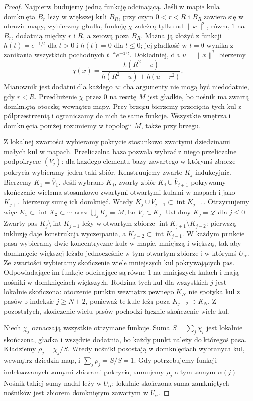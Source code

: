 \begin{proof}
Najpierw budujemy jedną funkcję odcinającą.
Jeśli w mapie kula domknięta $\overline B_r$
leży w większej kuli $B_R$, przy czym $0<r<R$
i $\overline B_R$ zawiera się w obrazie mapy,
wybierzmy gładką funkcję $\chi$ zależną tylko
od $\|x\|^2$, równą $1$ na $\overline B_r$,
dodatnią między $r$ i $R$, a zerową poza $B_R$.
Można ją złożyć z funkcji $h(t)=e^{-1/t}$ dla
$t>0$ i $h(t)=0$ dla $t\leq0$; jej gładkość w
$t=0$ wynika z zanikania wszystkich pochodnych
$t^{-a}e^{-1/t}$. Dokładniej, dla $u=\|x\|^2$ bierzemy
\[
 \chi(x)=\frac{h(R^2-u)}{h(R^2-u)+h(u-r^2)}.
\]
Mianownik jest dodatni dla każdego $u$: oba argumenty
nie mogą być niedodatnie, gdy $r<R$.
Przedłużenie $\chi$ przez $0$
na resztę $M$ jest gładkie, bo nośnik ma zwartą
domkniętą otoczkę wewnątrz mapy. Przy brzegu bierzemy
przecięcia tych kul z półprzestrzenią i ograniczamy do nich
te same funkcje. Wszystkie wnętrza i domknięcia poniżej
rozumiemy w topologii $M$, także przy brzegu.

Z lokalnej zwartości wybieramy pokrycie stosunkowo
zwartymi dziedzinami małych kul w mapach. Przeliczalna
baza pozwala wybrać z niego przeliczalne podpokrycie
$(V_j)$: dla każdego elementu bazy zawartego w którymś
zbiorze pokrycia wybieramy jeden taki zbiór.
Konstruujemy zwarte $K_j$ indukcyjnie.
Bierzemy $K_1=\overline V_1$. Jeśli wybrano $K_j$,
zwarty zbiór $K_j\cup\overline V_{j+1}$ pokrywamy
skończenie wieloma stosunkowo zwartymi otwartymi
kulami w mapach i jako $K_{j+1}$ bierzemy sumę
ich domknięć. Wtedy
$K_j\cup\overline V_{j+1}\subset\operatorname{int}K_{j+1}$.
Otrzymujemy więc
$K_1\subset\operatorname{int}K_2\subset\cdots$
oraz $\bigcup_jK_j=M$, bo $V_j\subset K_j$.
Ustalmy $K_j=\varnothing$ dla $j\leq0$.
Zwarty pas $K_j\setminus\operatorname{int}K_{j-1}$
leży w otwartym zbiorze
$\operatorname{int}K_{j+1}\setminus K_{j-2}$:
pierwszą inkluzję daje konstrukcja wyczerpania,
a $K_{j-2}\subset\operatorname{int}K_{j-1}$.
W każdym punkcie pasa wybieramy dwie koncentryczne
kule w mapie, mniejszą i większą, tak aby domknięcie
większej leżało jednocześnie w tym otwartym zbiorze
i w którymś $U_\alpha$. Ze zwartości wybieramy
skończenie wiele mniejszych kul pokrywających pas.
Odpowiadające im funkcje odcinające są równe $1$
na mniejszych kulach i mają nośniki w domknięciach większych.
Rodzina tych kul dla wszystkich $j$ jest
lokalnie skończona: otoczenie punktu wewnątrz
pewnego $K_N$ nie spotyka kul z pasów o indeksie
$j\geq N+2$, ponieważ te kule leżą poza
$K_{j-2}\supset K_N$. Z pozostałych, skończenie
wielu pasów pochodzi łącznie skończenie wiele kul.

Niech $\chi_j$ oznaczają wszystkie otrzymane
funkcje. Suma $S=\sum_j\chi_j$ jest lokalnie
skończona, gładka i wszędzie dodatnia, bo
każdy punkt należy do któregoś pasa. Kładziemy
$\rho_j=\chi_j/S$. Wtedy nośniki pozostają
w domknięciach wybranych kul, wewnątrz dziedzin map, i
$\sum_j\rho_j=S/S=1$.
Gdy potrzebujemy funkcji indeksowanych samymi zbiorami
pokrycia, sumujemy $\rho_j$ o tym samym $\alpha(j)$.
Nośnik takiej sumy nadal leży w $U_\alpha$:
lokalnie skończona suma zamkniętych nośników jest
zbiorem domkniętym zawartym w $U_\alpha$.
\end{proof}
